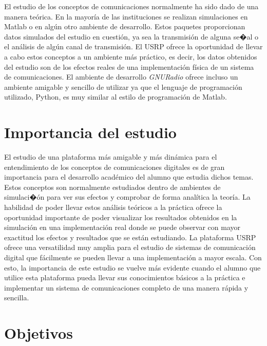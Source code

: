 El estudio de los conceptos de comunicaciones normalmente ha sido dado de una
manera te\'orica. En la mayor\'ia de las instituciones se realizan simulaciones
en Matlab o en alg\'un otro ambiente de desarrollo. Estos paquetes proporcionan
datos simulados del estudio en cuesti\'on, ya sea la transmisi\'on de alguna
se�al o el an\'alisis de alg\'un canal de transmisi\'on. El USRP ofrece la
oportunidad de llevar a cabo estos conceptos a un ambiente m\'as pr\'actico, es
decir, los datos obtenidos del estudio son de los efectos reales de una
implementaci\'on f\'isica de un sistema de comunicaciones. El ambiente de
desarrollo \emph{GNURadio} ofrece incluso un ambiente amigable y sencillo de
utilizar ya que el lenguaje de programaci\'on utilizado, Python, es muy similar
al estilo de programaci\'on de Matlab.

\section{Importancia del estudio}

El estudio de una plataforma m\'as amigable y m\'as din\'amica para el
entendimiento de los conceptos de comunicaciones digitales es de gran importancia para el 
desarrollo acad\'emico del alumno que estudia dichos temas. Estos conceptos son 
normalmente estudiados dentro de ambientes de simulaci�\'on para ver sus efectos 
y comprobar de forma anal\'itica la teor\'ia. La habilidad de poder llevar estos 
an\'alisis te\'oricos a la pr\'actica ofrece la oportunidad importante de poder 
visualizar los resultados obtenidos en la simulaci\'on en una implementaci\'on 
real donde se puede observar con mayor exactitud los efectos y resultados 
que se est\'an estudiando. La plataforma USRP ofrece una versatilidad muy 
amplia para el estudio de sistemas de comunicaci\'on digital que f\'acilmente 
se pueden llevar a una implementaci\'on a mayor escala. Con esto, la importancia 
de este estudio se vuelve m\'as evidente cuando el alumno que utilice esta 
plataforma pueda llevar sus conocimientos b\'asicos a la pr\'actica e
implementar un sistema de comunicaciones completo de una manera r\'apida y
sencilla.

\section{Objetivos}

